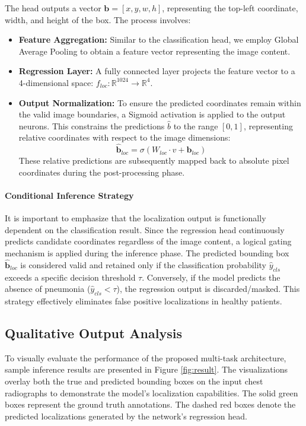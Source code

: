 \documentclass[a4paper,fleqn]{cas-dc}
\begin{document}
The head outputs a vector $\mathbf{b} = [x, y, w, h]$, representing the top-left coordinate, width, and height of the box. The process involves:
\begin{itemize}
	\item \textbf{Feature Aggregation:} Similar to the classification head, we employ Global Average Pooling to obtain a feature vector representing the image content.
	\item \textbf{Regression Layer:} A fully connected layer projects the feature vector to a 4-dimensional space: $f_{loc}: \mathbb{R}^{1024} \to \mathbb{R}^4$.
	\item \textbf{Output Normalization:} To ensure the predicted coordinates remain within the valid image boundaries, a Sigmoid activation is applied to the output neurons. This constrains the predictions $\hat{b}$ to the range $[0, 1]$, representing relative coordinates with respect to the image dimensions:
	\begin{equation}
		\hat{\mathbf{b}}_{loc} = \sigma(W_{loc} \cdot v + \mathbf{b}_{loc})
	\end{equation}
	These relative predictions are subsequently mapped back to absolute pixel coordinates during the post-processing phase.
\end{itemize}

\paragraph{Conditional Inference Strategy}

It is important to emphasize that the localization output is functionally dependent on the classification result. Since the regression head continuously predicts candidate coordinates regardless of the image content, a logical gating mechanism is applied during the inference phase. The predicted bounding box $\hat{\mathbf{b}}_{loc}$ is considered valid and retained only if the classification probability $\hat{y}_{cls}$ exceeds a specific decision threshold $\tau$. Conversely, if the model predicts the absence of pneumonia ($\hat{y}_{cls} < \tau$), the regression output is discarded/masked. This strategy effectively eliminates false positive localizations in healthy patients.
	
\subsection{Qualitative Output Analysis}
\label{sec:qualitative_output}

To visually evaluate the performance of the proposed multi-task architecture, sample inference results are presented in Figure \ref{fig:result}.
The visualizations overlay both the true and predicted bounding boxes on the input chest radiographs to demonstrate the model's localization capabilities. The solid green boxes represent the ground truth annotations. The dashed red boxes denote the predicted localizations generated by the network's regression head.
\end{document}

